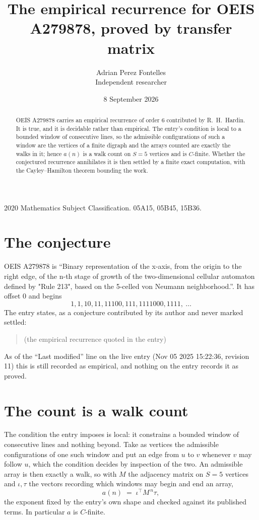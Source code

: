 \documentclass[11pt,a4paper]{article}
\title{The empirical recurrence for OEIS A279878, proved by transfer matrix}
\author{Adrian Perez Fontelles\\ \small Independent researcher}
\date{8 September 2026}
\theoremstyle{plain}
\theoremstyle{definition}
\begin{document}
\maketitle

\begin{abstract}
OEIS A279878 carries an empirical recurrence of order $6$ contributed by R.~H.~Hardin. It is
true, and it is decidable rather than empirical. The entry's condition is local to a bounded window of consecutive lines, so
the admissible configurations of such a window are the vertices of a finite digraph and the
arrays counted are exactly the walks in it; hence $a(n)$ is a walk count on $S=5$ vertices
and is $C$-finite. Whether the conjectured recurrence annihilates it is then settled by a
finite exact computation, with the Cayley--Hamilton theorem bounding the work.
\end{abstract}

\noindent\small 2020 Mathematics Subject Classification. 05A15, 05B45, 15B36.\normalsize

\section{The conjecture}

OEIS A279878 is ``Binary representation of the x-axis, from the origin to the right edge, of the n-th stage of growth of the two-dimensional cellular automaton defined by "Rule 213", based on the 5-celled von Neumann neighborhood.''. It has offset $0$ and begins
\[
1, 1, 10, 11, 11100, 111, 1111000, 1111,\ \dots
\]
The entry states, as a conjecture contributed by its author and never marked settled:
\begin{quote}
(the empirical recurrence quoted in the entry)
\end{quote}
As of the ``Last modified'' line on the live entry (Nov 05 2025 15:22:36, revision 11) this is still
recorded as empirical, and nothing on the entry records it as proved.

\section{The count is a walk count}

The condition the entry imposes is local: it constrains a bounded window of consecutive lines and nothing beyond. Take as
vertices the admissible configurations of one such window and put an edge from $u$ to $v$
whenever $v$ may follow $u$, which the condition decides by inspection of the two. An
admissible array is then exactly a walk, so with $M$ the adjacency matrix on $S=5$ vertices
and $\iota,\tau$ the vectors recording which windows may begin and end an array,
\[
a(n)\;=\;\iota^{\!\top}M^{\,n}\tau ,
\]
the exponent fixed by the entry's own shape and checked against its published terms. In
particular $a$ is $C$-finite.
\end{document}
